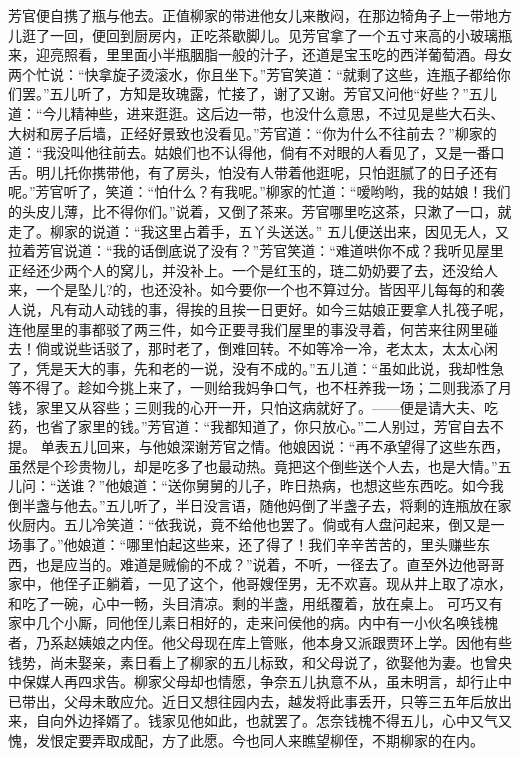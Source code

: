 \documentclass[12pt,oneside]{book}
\begin{document}
芳官便自携了瓶与他去。正值柳家的带进他女儿来散闷，在那边犄角子上一带地方儿逛了一回，便回到厨房内，正吃茶歇脚儿。见芳官拿了一个五寸来高的小玻璃瓶来，迎亮照看，里里面小半瓶胭脂一般的汁子，还道是宝玉吃的西洋葡萄酒。母女两个忙说：“快拿旋子烫滚水，你且坐下。”芳官笑道：“就剩了这些，连瓶子都给你们罢。”五儿听了，方知是玫瑰露，忙接了，谢了又谢。芳官又问他“好些？”五儿道：“今儿精神些，进来逛逛。这后边一带，也没什么意思，不过见是些大石头、大树和房子后墙，正经好景致也没看见。”芳官道：“你为什么不往前去？”柳家的道：“我没叫他往前去。姑娘们也不认得他，倘有不对眼的人看见了，又是一番口舌。明儿托你携带他，有了房头，怕没有人带着他逛呢，只怕逛腻了的日子还有呢。”芳官听了，笑道：“怕什么？有我呢。”柳家的忙道：“嗳哟哟，我的姑娘！我们的头皮儿薄，比不得你们。”说着，又倒了茶来。芳官哪里吃这茶，只漱了一口，就走了。柳家的说道：“我这里占着手，五丫头送送。”
五儿便送出来，因见无人，又拉着芳官说道：“我的话倒底说了没有？”芳官笑道：“难道哄你不成？我听见屋里正经还少两个人的窝儿，并没补上。一个是红玉的，琏二奶奶要了去，还没给人来，一个是坠儿?的，也还没补。如今要你一个也不算过分。皆因平儿每每的和袭人说，凡有动人动钱的事，得挨的且挨一日更好。如今三姑娘正要拿人扎筏子呢，连他屋里的事都驳了两三件，如今正要寻我们屋里的事没寻着，何苦来往网里碰去！倘或说些话驳了，那时老了，倒难回转。不如等冷一冷，老太太，太太心闲了，凭是天大的事，先和老的一说，没有不成的。”五儿道：“虽如此说，我却性急等不得了。趁如今挑上来了，一则给我妈争口气，也不枉养我一场；二则我添了月钱，家里又从容些；三则我的心开一开，只怕这病就好了。——便是请大夫、吃药，也省了家里的钱。”芳官道：“我都知道了，你只放心。”二人别过，芳官自去不提。
单表五儿回来，与他娘深谢芳官之情。他娘因说：“再不承望得了这些东西，虽然是个珍贵物儿，却是吃多了也最动热。竟把这个倒些送个人去，也是大情。”五儿问：“送谁？”他娘道：“送你舅舅的儿子，昨日热病，也想这些东西吃。如今我倒半盏与他去。”五儿听了，半日没言语，随他妈倒了半盏子去，将剩的连瓶放在家伙厨内。五儿冷笑道：“依我说，竟不给他也罢了。倘或有人盘问起来，倒又是一场事了。”他娘道：“哪里怕起这些来，还了得了！我们辛辛苦苦的，里头赚些东西，也是应当的。难道是贼偷的不成？”说着，不听，一径去了。直至外边他哥哥家中，他侄子正躺着，一见了这个，他哥嫂侄男，无不欢喜。现从井上取了凉水，和吃了一碗，心中一畅，头目清凉。剩的半盏，用纸覆着，放在桌上。
可巧又有家中几个小厮，同他侄儿素日相好的，走来问侯他的病。内中有一小伙名唤钱槐者，乃系赵姨娘之内侄。他父母现在库上管账，他本身又派跟贾环上学。因他有些钱势，尚未娶亲，素日看上了柳家的五儿标致，和父母说了，欲娶他为妻。也曾央中保媒人再四求告。柳家父母却也情愿，争奈五儿执意不从，虽未明言，却行止中已带出，父母未敢应允。近日又想往园内去，越发将此事丢开，只等三五年后放出来，自向外边择婿了。钱家见他如此，也就罢了。怎奈钱槐不得五儿，心中又气又愧，发恨定要弄取成配，方了此愿。今也同人来瞧望柳侄，不期柳家的在内。
\end{document}

